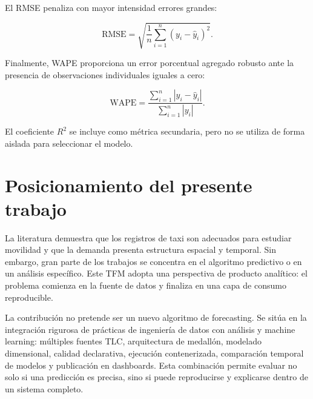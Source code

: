 El RMSE penaliza con mayor intensidad errores grandes:

\begin{equation}
\mathrm{RMSE}=\sqrt{\frac{1}{n}\sum_{i=1}^{n}{\left(y_i-\hat{y}_i\right)}^{2}}.
\end{equation}

Finalmente, WAPE proporciona un error porcentual agregado robusto ante la presencia de observaciones individuales iguales a cero:

\begin{equation}
\mathrm{WAPE}=\frac{\sum_{i=1}^{n}|y_i-\hat{y}_i|}{\sum_{i=1}^{n}|y_i|}.
\end{equation}

El coeficiente \(R^2\) se incluye como métrica secundaria, pero no se utiliza de forma aislada para seleccionar el modelo.

\section{Posicionamiento del presente trabajo}

La literatura demuestra que los registros de taxi son adecuados para estudiar movilidad y que la demanda presenta estructura espacial y temporal. Sin embargo, gran parte de los trabajos se concentra en el algoritmo predictivo o en un análisis específico. Este TFM adopta una perspectiva de producto analítico: el problema comienza en la fuente de datos y finaliza en una capa de consumo reproducible.

La contribución no pretende ser un nuevo algoritmo de forecasting. Se sitúa en la integración rigurosa de prácticas de ingeniería de datos con análisis y machine learning: múltiples fuentes TLC, arquitectura de medallón, modelado dimensional, calidad declarativa, ejecución contenerizada, comparación temporal de modelos y publicación en dashboards. Esta combinación permite evaluar no solo si una predicción es precisa, sino si puede reproducirse y explicarse dentro de un sistema completo.
